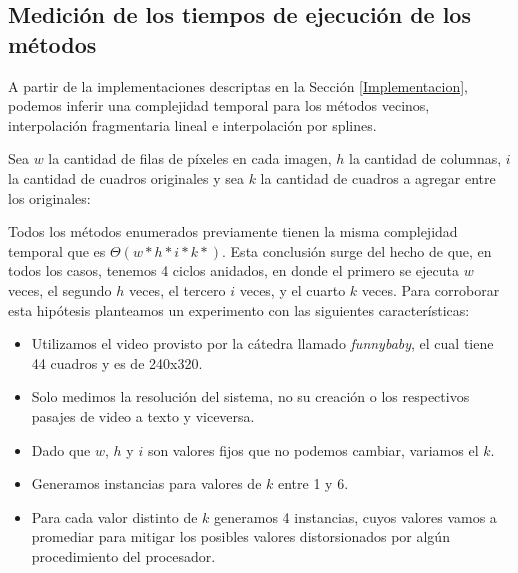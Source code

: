 \subsection{Medición de los tiempos de ejecución de los métodos}
A partir de la implementaciones descriptas en la Sección \ref{Implementacion},
podemos inferir una complejidad temporal para los métodos vecinos, interpolación fragmentaria lineal e interpolación por splines.

Sea $w$ la cantidad de filas de píxeles en cada imagen, $h$ la cantidad de
columnas, $i$ la cantidad de cuadros originales y sea $k$ la cantidad de
cuadros a agregar entre los originales:

Todos los métodos enumerados previamente tienen la misma complejidad temporal que es
 $\Theta(w*h*i*k*)$. Esta conclusión surge del hecho de que, en todos los casos,
 tenemos 4 ciclos anidados, en donde el primero se ejecuta $w$ veces, el segundo
 $h$ veces, el tercero $i$ veces, y el cuarto $k$ veces.
\newline
\newline
Para corroborar esta hipótesis planteamos un experimento con las siguientes características:
\begin{itemize}
  \item Utilizamos el video provisto por la cátedra llamado \textit{funnybaby}, el cual tiene 44 cuadros y es de 240x320.
  \item Solo medimos la resolución del sistema, no su creación o los respectivos pasajes de video a texto y viceversa.
  \item Dado que $w$, $h$ y $i$ son valores fijos que no podemos cambiar, variamos el $k$.
  \item Generamos instancias para valores de $k$ entre 1 y 6.
  \item Para cada valor distinto de $k$ generamos 4 instancias, cuyos valores vamos a promediar para mitigar los posibles valores distorsionados por algún procedimiento del procesador.
\end{itemize}


